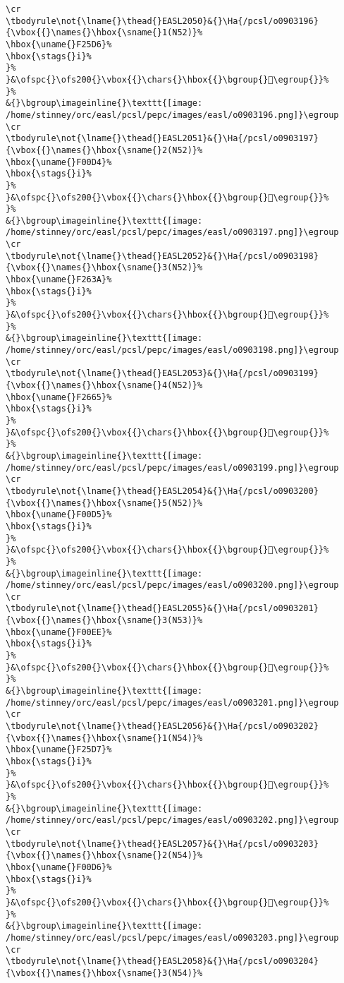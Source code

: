 \begin{verbatim}
\cr
\tbodyrule\not{\lname{}\thead{}EASL2050}&{}\Ha{/pcsl/o0903196}{\vbox{{}\names{}\hbox{\sname{}1(N52)}%
\hbox{\uname{}F25D6}%
\hbox{\stags{}i}%
}%
}&\ofspc{}\ofs200{}\vbox{{}\chars{}\hbox{{}\bgroup{}󲗖\egroup{}}%
}%
&{}\bgroup\imageinline{}\texttt{[image: /home/stinney/orc/easl/pcsl/pepc/images/easl/o0903196.png]}\egroup
\cr
\tbodyrule\not{\lname{}\thead{}EASL2051}&{}\Ha{/pcsl/o0903197}{\vbox{{}\names{}\hbox{\sname{}2(N52)}%
\hbox{\uname{}F00D4}%
\hbox{\stags{}i}%
}%
}&\ofspc{}\ofs200{}\vbox{{}\chars{}\hbox{{}\bgroup{}󰃔\egroup{}}%
}%
&{}\bgroup\imageinline{}\texttt{[image: /home/stinney/orc/easl/pcsl/pepc/images/easl/o0903197.png]}\egroup
\cr
\tbodyrule\not{\lname{}\thead{}EASL2052}&{}\Ha{/pcsl/o0903198}{\vbox{{}\names{}\hbox{\sname{}3(N52)}%
\hbox{\uname{}F263A}%
\hbox{\stags{}i}%
}%
}&\ofspc{}\ofs200{}\vbox{{}\chars{}\hbox{{}\bgroup{}󲘺\egroup{}}%
}%
&{}\bgroup\imageinline{}\texttt{[image: /home/stinney/orc/easl/pcsl/pepc/images/easl/o0903198.png]}\egroup
\cr
\tbodyrule\not{\lname{}\thead{}EASL2053}&{}\Ha{/pcsl/o0903199}{\vbox{{}\names{}\hbox{\sname{}4(N52)}%
\hbox{\uname{}F2665}%
\hbox{\stags{}i}%
}%
}&\ofspc{}\ofs200{}\vbox{{}\chars{}\hbox{{}\bgroup{}󲙥\egroup{}}%
}%
&{}\bgroup\imageinline{}\texttt{[image: /home/stinney/orc/easl/pcsl/pepc/images/easl/o0903199.png]}\egroup
\cr
\tbodyrule\not{\lname{}\thead{}EASL2054}&{}\Ha{/pcsl/o0903200}{\vbox{{}\names{}\hbox{\sname{}5(N52)}%
\hbox{\uname{}F00D5}%
\hbox{\stags{}i}%
}%
}&\ofspc{}\ofs200{}\vbox{{}\chars{}\hbox{{}\bgroup{}󰃕\egroup{}}%
}%
&{}\bgroup\imageinline{}\texttt{[image: /home/stinney/orc/easl/pcsl/pepc/images/easl/o0903200.png]}\egroup
\cr
\tbodyrule\not{\lname{}\thead{}EASL2055}&{}\Ha{/pcsl/o0903201}{\vbox{{}\names{}\hbox{\sname{}3(N53)}%
\hbox{\uname{}F00EE}%
\hbox{\stags{}i}%
}%
}&\ofspc{}\ofs200{}\vbox{{}\chars{}\hbox{{}\bgroup{}󰃮\egroup{}}%
}%
&{}\bgroup\imageinline{}\texttt{[image: /home/stinney/orc/easl/pcsl/pepc/images/easl/o0903201.png]}\egroup
\cr
\tbodyrule\not{\lname{}\thead{}EASL2056}&{}\Ha{/pcsl/o0903202}{\vbox{{}\names{}\hbox{\sname{}1(N54)}%
\hbox{\uname{}F25D7}%
\hbox{\stags{}i}%
}%
}&\ofspc{}\ofs200{}\vbox{{}\chars{}\hbox{{}\bgroup{}󲗗\egroup{}}%
}%
&{}\bgroup\imageinline{}\texttt{[image: /home/stinney/orc/easl/pcsl/pepc/images/easl/o0903202.png]}\egroup
\cr
\tbodyrule\not{\lname{}\thead{}EASL2057}&{}\Ha{/pcsl/o0903203}{\vbox{{}\names{}\hbox{\sname{}2(N54)}%
\hbox{\uname{}F00D6}%
\hbox{\stags{}i}%
}%
}&\ofspc{}\ofs200{}\vbox{{}\chars{}\hbox{{}\bgroup{}󰃖\egroup{}}%
}%
&{}\bgroup\imageinline{}\texttt{[image: /home/stinney/orc/easl/pcsl/pepc/images/easl/o0903203.png]}\egroup
\cr
\tbodyrule\not{\lname{}\thead{}EASL2058}&{}\Ha{/pcsl/o0903204}{\vbox{{}\names{}\hbox{\sname{}3(N54)}%

\end{verbatim}
